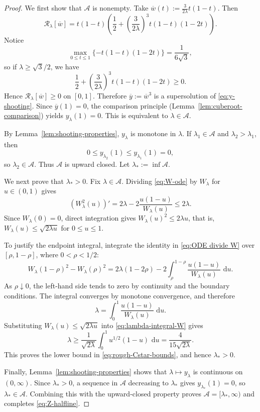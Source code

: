 \documentclass[12pt,preprint]{amsart}
\numberwithin{equation}{section}
\theoremstyle{plain}
\theoremstyle{definition}
\newcommand{\dd}{\,\mathrm d}
\begin{document}
\begin{proof}
We first show that \(\mathcal A\) is nonempty. Take \(\overline w(t):=\frac{3}{2\lambda}t(1-t)\).
Then
\[
 \mathcal R_\lambda[\overline w]
 =t(1-t)\left(\frac{1}{2}+\left(\frac{3}{2\lambda}\right)^3t(1-t)(1-2t)\right).
\]
Notice
\[
 \max_{0\le t\le1}\{-t(1-t)(1-2t)\}=\frac1{6\sqrt3},
\]
so if \(\lambda\ge\sqrt3/2\), we have
\[
\frac{1}{2}+\left(\frac{3}{2\lambda}\right)^3t(1-t)(1-2t) \ge 0.
\]
Hence
\(\mathcal R_\lambda[\overline w]\ge0\) on \([0,1]\).  Therefore \(\overline y:=\overline w^3\) is a supersolution of
\eqref{eq:y-shooting}.  Since $\overline y(1)=0$, the comparison
principle (Lemma~\ref{lem:cuberoot-comparison}) yields
\(y_\lambda(1)=0\). This is equivalent to \(\lambda\in\mathcal A\).

By Lemma~\ref{lem:shooting-properties}, $y_\lambda$ is monotone in
$\lambda$.  If $\lambda_1\in\mathcal A$ and $\lambda_2>\lambda_1$, then
\[
 0\le y_{\lambda_2}(1)\le y_{\lambda_1}(1)=0,
\]
so $\lambda_2\in\mathcal A$.  Thus $\mathcal A$ is upward closed.  Let
$\lambda_*:=\inf\mathcal A$.

We next prove that $\lambda_*>0$.  Fix $\lambda\in\mathcal A$.  Dividing
\eqref{eq:W-ode} by $W_\lambda$ for $u\in(0,1)$ gives
\begin{equation}
 (W_\lambda^2(u))'
 =2\lambda-2\frac{u(1-u)}{W_\lambda(u)}
 \le2\lambda.
 \label{eq:ODE divide W}
\end{equation}
Since $W_\lambda(0)=0$, direct integration gives
$W_\lambda(u)^2\le2\lambda u$, that is,
$W_\lambda(u)\le\sqrt{2\lambda u}$ for $0\le u\le1$.

To justify the endpoint integral, integrate the identity in
\eqref{eq:ODE divide W} over $[\rho,1-\rho]$, where $0<\rho<1/2$:
\[
 W_\lambda(1-\rho)^2-W_\lambda(\rho)^2
 =2\lambda(1-2\rho)
  -2\int_\rho^{1-\rho}
      \frac{u(1-u)}{W_\lambda(u)}\,\dd u.
\]
As $\rho\downarrow0$, the left-hand side tends to zero by continuity and
the boundary conditions.  The integral converges by monotone convergence,
and therefore
\begin{equation}
 \lambda=\int_0^1\frac{u(1-u)}{W_\lambda(u)}\,\dd u.
 \label{eq:lambda-integral-W}
\end{equation}
Substituting $W_\lambda(u)\le\sqrt{2\lambda u}$ into
\eqref{eq:lambda-integral-W} gives
\[
 \lambda\ge\frac1{\sqrt{2\lambda}}
 \int_0^1u^{1/2}(1-u)\,\dd u
 =\frac4{15\sqrt{2\lambda}}.
\]
This proves the lower bound in \eqref{eq:rough-Cstar-bounds}, and hence
$\lambda_*>0$.

Finally, Lemma~\ref{lem:shooting-properties} shows that
$\lambda\mapsto y_\lambda$ is continuous on $(0,\infty)$.  Since
$\lambda_*>0$, a sequence in $\mathcal A$ decreasing to $\lambda_*$ gives
$y_{\lambda_*}(1)=0$, so $\lambda_*\in\mathcal A$.  Combining this with
the upward-closed property proves $\mathcal A=[\lambda_*,\infty)$ and
completes \eqref{eq:Z-halfline}.
\end{proof}
\end{document}
